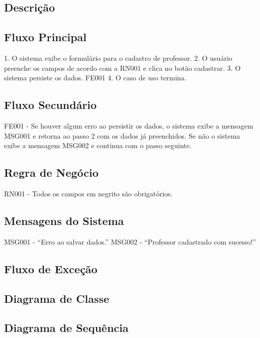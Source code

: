 \subsection{Descrição}

\subsection{Fluxo Principal}
1.  O sistema exibe o formulário para o cadastro de professor.
2.	O usuário preenche os campos de acordo com a RN001 e clica no botão cadastrar.
3.	O sistema persiste os dados. FE001
4.	O caso de uso termina.

\subsection{Fluxo Secundário}
FE001 - Se houver algum erro ao persistir os dados, o sistema exibe a mensagem  MSG001 e retorna ao passo 2 com os dados já preenchidos. Se não o sistema exibe a mensagem MSG002 e continua com o passo seguinte.

\subsection{Regra de Negócio}
    RN001 - Todos os campos em negrito são obrigatórios.

\subsection{Mensagens do Sistema} 
    MSG001 - “Erro ao salvar dados.”
    MSG002 - “Professor cadastrado com sucesso!”

\subsection{Fluxo de Exceção}

\subsection{Diagrama de Classe}

\subsection{Diagrama de Sequência}